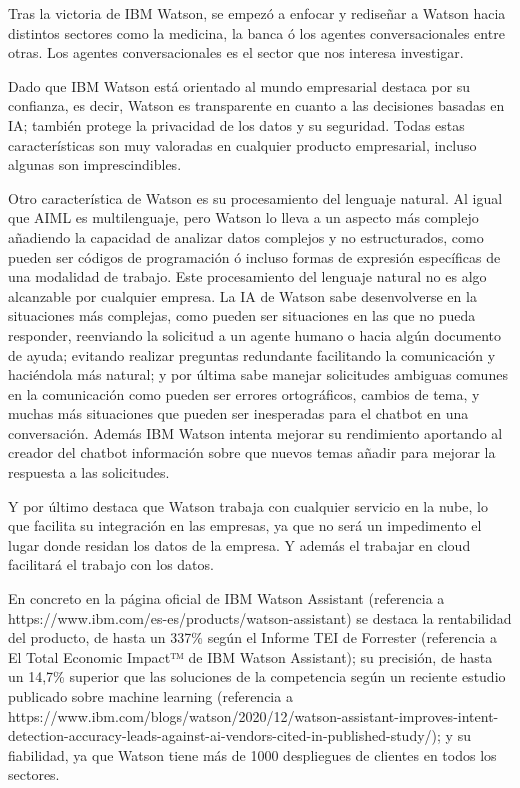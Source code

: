 Tras la victoria de IBM Watson, se empezó a enfocar y rediseñar a Watson hacia distintos sectores como la medicina, la banca ó los agentes conversacionales entre otras. Los agentes conversacionales es el sector que nos interesa investigar.

Dado que IBM Watson está orientado al mundo empresarial destaca por su confianza, es decir, Watson es transparente en cuanto a las decisiones basadas en IA; también protege la privacidad de los datos y su seguridad. Todas estas características son muy valoradas en cualquier producto empresarial, incluso algunas son imprescindibles.

Otro característica de Watson es su procesamiento del lenguaje natural. Al igual que AIML es multilenguaje, pero Watson lo lleva a un aspecto más complejo añadiendo la capacidad de analizar datos complejos y no estructurados, como pueden ser códigos de programación ó incluso formas de expresión específicas de una modalidad de trabajo. Este procesamiento del lenguaje natural no es algo alcanzable por cualquier empresa. La IA de Watson sabe desenvolverse en la situaciones más complejas, como pueden ser situaciones en las que no pueda responder, reenviando la solicitud a un agente humano o hacia algún documento de ayuda; evitando realizar preguntas redundante facilitando la comunicación y haciéndola más natural; y por última sabe manejar solicitudes ambiguas comunes en la comunicación como pueden ser errores ortográficos, cambios de tema, y muchas más situaciones que pueden ser inesperadas para el chatbot en una conversación. Además IBM Watson intenta mejorar su rendimiento aportando al creador del chatbot información sobre que nuevos temas añadir para mejorar la respuesta a las solicitudes.

Y por último destaca que Watson trabaja con cualquier servicio en la nube, lo que facilita su integración en las empresas, ya que no será un impedimento el lugar donde residan los datos de la empresa. Y además el trabajar en cloud facilitará el trabajo con los datos.

En concreto en la página oficial de IBM Watson Assistant (referencia a https://www.ibm.com/es-es/products/watson-assistant) se destaca la rentabilidad del producto, de hasta un 337\% según el Informe TEI de Forrester (referencia a El Total Economic Impact™ de IBM Watson Assistant); su precisión, de hasta un 14,7\% superior que las soluciones de la competencia según un reciente estudio publicado sobre machine learning (referencia a https://www.ibm.com/blogs/watson/2020/12/watson-assistant-improves-intent-detection-accuracy-leads-against-ai-vendors-cited-in-published-study/); y su fiabilidad, ya que Watson tiene más de 1000 despliegues de clientes en todos los sectores.



